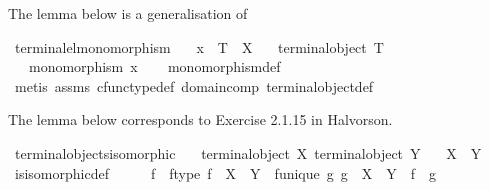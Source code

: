 \begin{isabellebody}
%
\begin{isamarkuptext}%
The lemma below is a generalisation of %
\end{isamarkuptext}\isamarkuptrue%
\isamarkupfalse%
\ terminal{\isacharunderscore}{\kern0pt}el{\isacharunderscore}{\kern0pt}monomorphism{\isacharcolon}{\kern0pt}\isanewline
\ \ \ {\isachardoublequoteopen}x\ {\isacharcolon}{\kern0pt}\ T\ {\isasymrightarrow}\ X{\isachardoublequoteclose}\isanewline
\ \ \ {\isachardoublequoteopen}terminal{\isacharunderscore}{\kern0pt}object\ T{\isachardoublequoteclose}\isanewline
\ \ \ {\isachardoublequoteopen}monomorphism\ x{\isachardoublequoteclose}\isanewline
%
\isadelimproof
\ \ %
\endisadelimproof
%
\isatagproof
{}\isamarkupfalse%
\ monomorphism{\isacharunderscore}{\kern0pt}def\isanewline
\ \ \isamarkupfalse%
\ {\isacharparenleft}{\kern0pt}metis\ assms\ cfunc{\isacharunderscore}{\kern0pt}type{\isacharunderscore}{\kern0pt}def\ domain{\isacharunderscore}{\kern0pt}comp\ terminal{\isacharunderscore}{\kern0pt}object{\isacharunderscore}{\kern0pt}def{\isacharparenright}{\kern0pt}%
\endisatagproof
{\isafoldproof}%
%
\isadelimproof
%
\endisadelimproof
%
\begin{isamarkuptext}%
The lemma below corresponds to Exercise 2.1.15 in Halvorson.%
\end{isamarkuptext}\isamarkuptrue%
\isamarkupfalse%
\ terminal{\isacharunderscore}{\kern0pt}objects{\isacharunderscore}{\kern0pt}isomorphic{\isacharcolon}{\kern0pt}\isanewline
\ \ \ {\isachardoublequoteopen}terminal{\isacharunderscore}{\kern0pt}object\ X{\isachardoublequoteclose}\ {\isachardoublequoteopen}terminal{\isacharunderscore}{\kern0pt}object\ Y{\isachardoublequoteclose}\isanewline
\ \ \ {\isachardoublequoteopen}X\ {\isasymcong}\ Y{\isachardoublequoteclose}\isanewline
%
\isadelimproof
\ \ %
\endisadelimproof
%
\isatagproof
{}\isamarkupfalse%
\ is{\isacharunderscore}{\kern0pt}isomorphic{\isacharunderscore}{\kern0pt}def\isanewline
{}\isamarkupfalse%
\ {\isacharminus}{\kern0pt}\isanewline
\ \ \isamarkupfalse%
\ f\ \ f{\isacharunderscore}{\kern0pt}type{\isacharcolon}{\kern0pt}\ {\isachardoublequoteopen}f\ {\isacharcolon}{\kern0pt}\ X\ {\isasymrightarrow}\ Y{\isachardoublequoteclose}\ \ f{\isacharunderscore}{\kern0pt}unique{\isacharcolon}{\kern0pt}\ {\isachardoublequoteopen}{\isasymforall}g{\isachardot}{\kern0pt}\ g\ {\isacharcolon}{\kern0pt}\ X\ {\isasymrightarrow}\ Y\ {\isasymlongrightarrow}\ f\ {\isacharequal}{\kern0pt}\ g{\isachardoublequoteclose}\isanewline

\end{isabellebody}

